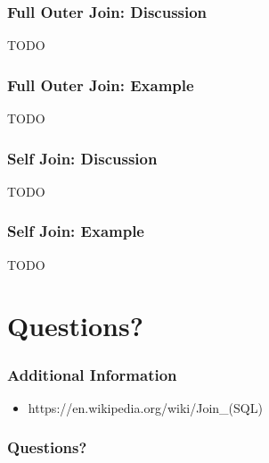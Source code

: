 \documentclass{beamer}
\begin{document}
\begin{frame}
  \frametitle{Full Outer Join: Discussion}
  TODO
\end{frame}

\begin{frame}
  \frametitle{Full Outer Join: Example}
  TODO
\end{frame}

\begin{frame}
  \frametitle{Self Join: Discussion}
  TODO
\end{frame}

\begin{frame}
  \frametitle{Self Join: Example}
  TODO
\end{frame}


\section{Questions?}

\begin{frame}
  \frametitle{Additional Information}
  \begin{itemize}
  \item https://en.wikipedia.org/wiki/Join\_(SQL)
  \end{itemize}
\end{frame}

\begin{frame}
 \frametitle{Questions?}

\end{frame}
\end{document}
